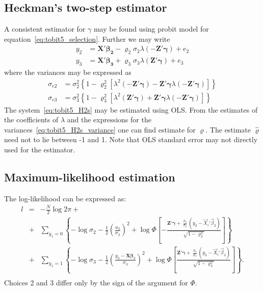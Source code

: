 \documentclass[a4paper]{article}
\begin{document}
\subsection{Heckman's two-step estimator}

A consistent estimator for $\gamma$ may be found using probit model
for equation~\ref{eq:tobit5_selection}.  Further we may write
\begin{equation}
  \begin{split}
    y_2 &= \bm{X}'\bm{\beta_2} - \varrho_2\sigma_2 \lambda(
    -\bm{Z}'\bm{\gamma}) + e_2 \\
    y_3 &= \bm{X}'\bm{\beta_3} + \varrho_3\sigma_3 \lambda(
    \bm{Z}'\bm{\gamma}) + e_3
  \end{split}
\label{eq:tobit5_H2s}
\end{equation}
where the variances may be expressed \citet{amemiya1985} as
\begin{equation}
  \begin{split}
\sigma_{e2} &= \sigma_2^2 \left\{
  1 - \varrho_2^2 \left[
    \lambda^2( -\bm{Z}'\bm{\gamma}) -
    \bm{Z}'\bm{\gamma} \lambda( -\bm{Z}'\bm{\gamma}) \right]
  \right\} \\
\sigma_{e3} &= \sigma_3^2 \left\{
  1 - \varrho_3^2 \left[
    \lambda^2( \bm{Z}'\bm{\gamma}) +
    \bm{Z}'\bm{\gamma} \lambda( -\bm{Z}'\bm{\gamma}) \right] \right\}
  \end{split}
\label{eq:tobit5_H2s_variance}
\end{equation} 
The system~\eqref{eq:tobit5_H2s} may be estimated using OLS.  From the
estimates of the coefficients of $\lambda$ and the expressions for the
variances~\eqref{eq:tobit5_H2s_variance} one can find estimate for
$\varrho$.  The estimate $\hat\varrho$ need not to lie between -1 and
1.  Note that OLS standard error may not directly used for the
estimator.  


\subsection{Maximum-likelihood estimation}

The log-likelihood can be expressed as:
\begin{eqnarray}
  l &=& -\frac{N}{2}\log 2\pi + \nonumber\\
  &+& 
  \sum_{y_1=0} \left\{
  -\log\sigma_2
  -\frac{1}{2}\left( \frac{u_2}{\sigma_2} \right)^2
  +\log \Phi \left[ -\frac
    {\bm{Z}'\bm{\gamma} + \displaystyle \frac{\varrho_2}{\sigma_2}
      \left( y_2 - \vec{X}_i'\vec{\beta}_2 \right)}
    {\sqrt{ 1 - \varrho_2^2}} \right] \right\} \nonumber\\
&+& 
\sum_{y_1=1} \left\{
  -\log\sigma_3
  -\frac{1}{2}\left( \frac{y_3 - \bm{X\beta}_3}{\sigma_3} \right)^2
  +\log \Phi \left[ \frac
    {\bm{Z'}\bm{\gamma} + \displaystyle \frac{\varrho_3}{\sigma_3}
      \left( y_3 - \vec{X}_i'\vec{\beta}_3 \right)}
    {\sqrt{ 1 - \varrho_3^2}} \right] \right\}. \nonumber\\
&&
\end{eqnarray}
Choices 2 and 3 differ only by the sign of the argument for $\Phi$.
\end{document}
